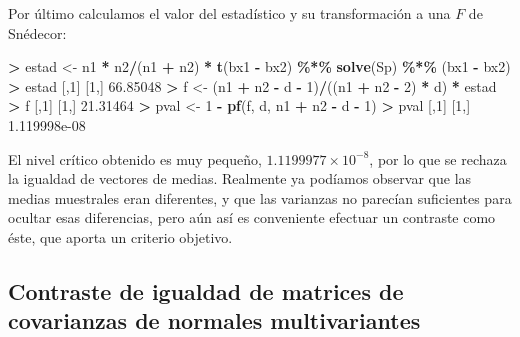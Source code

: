 \documentclass[
  a4paper,
  oneside]{scrbook}
\newenvironment{Shaded}{\begin{snugshade}}{\end{snugshade}}
\newcommand{\DecValTok}[1]{\textcolor[rgb]{0.00,0.00,0.81}{#1}}
\newcommand{\FloatTok}[1]{\textcolor[rgb]{0.00,0.00,0.81}{#1}}
\newcommand{\FunctionTok}[1]{\textcolor[rgb]{0.13,0.29,0.53}{\textbf{#1}}}
\newcommand{\NormalTok}[1]{#1}
\newcommand{\OtherTok}[1]{\textcolor[rgb]{0.56,0.35,0.01}{#1}}
\newcommand{\SpecialCharTok}[1]{\textcolor[rgb]{0.81,0.36,0.00}{\textbf{#1}}}
\theoremstyle{definition}
\theoremstyle{definition}
\theoremstyle{definition}
\theoremstyle{definition}
\theoremstyle{remark}
\begin{document}
\normalsize

Por último calculamos el valor del estadístico y su transformación a una
\(F\) de Snédecor:

\footnotesize

\begin{Shaded}
\begin{Highlighting}[]
\SpecialCharTok{\textgreater{}}\NormalTok{ estad }\OtherTok{\textless{}{-}}\NormalTok{ n1 }\SpecialCharTok{*}\NormalTok{ n2}\SpecialCharTok{/}\NormalTok{(n1 }\SpecialCharTok{+}\NormalTok{ n2) }\SpecialCharTok{*} \FunctionTok{t}\NormalTok{(bx1 }\SpecialCharTok{{-}}\NormalTok{ bx2) }\SpecialCharTok{\%*\%} \FunctionTok{solve}\NormalTok{(Sp) }\SpecialCharTok{\%*\%}\NormalTok{ (bx1 }\SpecialCharTok{{-}}\NormalTok{ bx2)}
\SpecialCharTok{\textgreater{}}\NormalTok{ estad}
\NormalTok{         [,}\DecValTok{1}\NormalTok{]}
\NormalTok{[}\DecValTok{1}\NormalTok{,] }\FloatTok{66.85048}
\SpecialCharTok{\textgreater{}}\NormalTok{ f }\OtherTok{\textless{}{-}}\NormalTok{ (n1 }\SpecialCharTok{+}\NormalTok{ n2 }\SpecialCharTok{{-}}\NormalTok{ d }\SpecialCharTok{{-}} \DecValTok{1}\NormalTok{)}\SpecialCharTok{/}\NormalTok{((n1 }\SpecialCharTok{+}\NormalTok{ n2 }\SpecialCharTok{{-}} \DecValTok{2}\NormalTok{) }\SpecialCharTok{*}\NormalTok{ d) }\SpecialCharTok{*}\NormalTok{ estad}
\SpecialCharTok{\textgreater{}}\NormalTok{ f}
\NormalTok{         [,}\DecValTok{1}\NormalTok{]}
\NormalTok{[}\DecValTok{1}\NormalTok{,] }\FloatTok{21.31464}
\SpecialCharTok{\textgreater{}}\NormalTok{ pval }\OtherTok{\textless{}{-}} \DecValTok{1} \SpecialCharTok{{-}} \FunctionTok{pf}\NormalTok{(f, d, n1 }\SpecialCharTok{+}\NormalTok{ n2 }\SpecialCharTok{{-}}\NormalTok{ d }\SpecialCharTok{{-}} \DecValTok{1}\NormalTok{)}
\SpecialCharTok{\textgreater{}}\NormalTok{ pval}
\NormalTok{             [,}\DecValTok{1}\NormalTok{]}
\NormalTok{[}\DecValTok{1}\NormalTok{,] }\FloatTok{1.119998e{-}08}
\end{Highlighting}
\end{Shaded}

\normalsize

El nivel crítico obtenido es muy pequeño, \ensuremath{1.1199977\times 10^{-8}}, por lo
que se rechaza la igualdad de vectores de medias. Realmente ya podíamos
observar que las medias muestrales eran diferentes, y que las varianzas
no parecían suficientes para ocultar esas diferencias, pero aún así es
conveniente efectuar un contraste como éste, que aporta un criterio
objetivo.

\subsection{Contraste de igualdad de matrices de covarianzas de normales multivariantes}\label{contraste-de-igualdad-de-matrices-de-covarianzas-de-normales-multivariantes}
\end{document}
